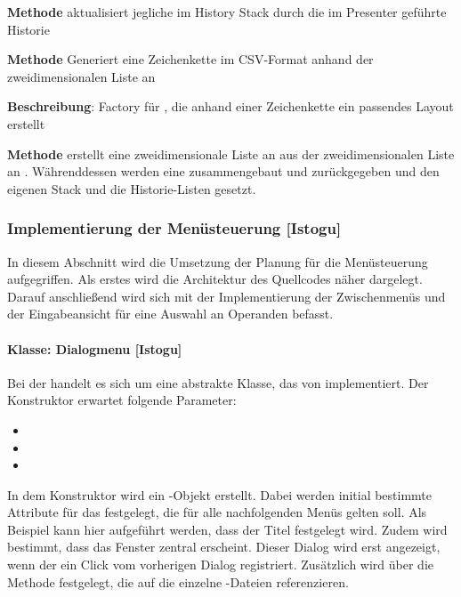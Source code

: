 \textbf{Methode}  aktualisiert jegliche  im History Stack durch die im Presenter geführte Historie

\textbf{Methode}  Generiert eine Zeichenkette im CSV-Format anhand der zweidimensionalen Liste an 

\textbf{Beschreibung}: Factory für , die anhand einer Zeichenkette ein passendes Layout erstellt

\textbf{Methode}  erstellt eine zweidimensionale Liste an  aus der zweidimensionalen Liste an . Währenddessen werden eine  zusammengebaut und zurückgegeben und den eigenen Stack und die Historie-Listen gesetzt.

\subsubsection{Implementierung der Menüsteuerung [Istogu]}

In diesem Abschnitt wird die Umsetzung der Planung für die Menüsteuerung aufgegriffen. Als erstes wird die Architektur des Quellcodes näher dargelegt. Darauf anschließend wird sich mit der Implementierung der Zwischenmenüs und der Eingabeansicht für eine Auswahl an Operanden befasst.

\paragraph{Klasse: Dialogmenu [Istogu]}

Bei der  handelt es sich um eine abstrakte Klasse, das von  implementiert. Der Konstruktor erwartet folgende Parameter:

\begin{itemize}
	\item {}
	\item {}
	\item {}
\end{itemize}

In dem Konstruktor wird ein -Objekt erstellt. Dabei werden initial bestimmte Attribute für das  festgelegt, die für alle nachfolgenden Menüs gelten soll. Als Beispiel kann hier aufgeführt werden, dass der Titel festgelegt wird. Zudem wird bestimmt, dass das Fenster zentral erscheint. Dieser Dialog wird erst angezeigt, wenn der  ein Click vom vorherigen Dialog registriert. Zusätzlich wird  über die Methode  festgelegt, die auf die einzelne -Dateien referenzieren. 

